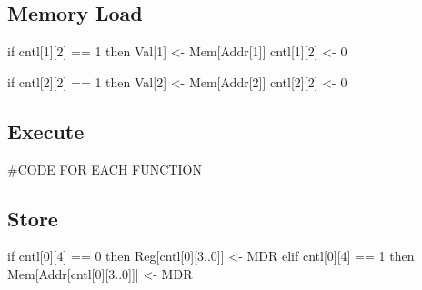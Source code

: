 \documentclass[12pt]{article}
\begin{document}
\subsection{Memory Load}
\begin{verbatimtab}
if cntl[1][2] == 1 then
   Val[1] <- Mem[Addr[1]]
   cntl[1][2] <- 0

if cntl[2][2] == 1 then
   Val[2] <- Mem[Addr[2]]
   cntl[2][2] <- 0
\end{verbatimtab}
\subsection{Execute}
\begin{verbatimtab}
   #CODE FOR EACH FUNCTION
\end{verbatimtab}
\subsection{Store}
\begin{verbatimtab}
if cntl[0][4] == 0 then
   Reg[cntl[0][3..0]] <- MDR
elif cntl[0][4] == 1 then
   Mem[Addr[cntl[0][3..0]]] <- MDR
\end{verbatimtab}
\end{document}
